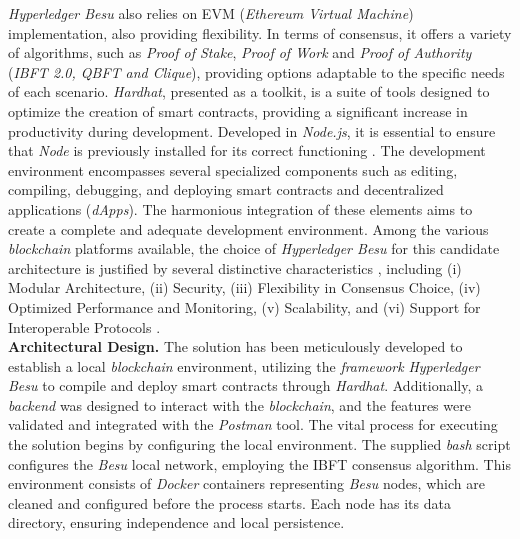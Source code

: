 \textit{Hyperledger Besu} also relies on EVM (\textit{Ethereum Virtual Machine}) implementation, also providing flexibility. %
In terms of consensus, it offers a variety of algorithms, such as \textit{Proof of Stake}, \textit{Proof of Work} and \textit{Proof of Authority} (\textit{IBFT 2.0, QBFT and Clique}), providing options adaptable to the specific needs of each scenario. \textit{Hardhat}, presented as a toolkit, is a suite of tools designed to optimize the creation of smart contracts, providing a significant increase in productivity during development. Developed in \textit{Node.js}, it is essential to ensure that \textit{Node} is previously installed for its correct functioning \cite{Jain2023}.
The development environment encompasses several specialized components such as editing, compiling, debugging, and deploying smart contracts and decentralized applications (\textit{dApps}). The harmonious integration of these elements aims to create a complete and adequate development environment.
Among the various \textit{blockchain} platforms available, the choice of \textit{Hyperledger Besu} for this candidate architecture is justified by several distinctive characteristics \cite{hasan2020blockchain}, including (i) Modular Architecture, (ii) Security, (iii) Flexibility in Consensus Choice, (iv) Optimized Performance and Monitoring, (v) Scalability, and (vi) Support for Interoperable Protocols \cite{Alba2023, Fan2022}.
\\
\noindent\textbf{Architectural Design.} The solution has been meticulously developed to establish a local \textit{blockchain} environment, utilizing the \textit{framework} \textit{Hyperledger Besu} to compile and deploy smart contracts through \textit{Hardhat}. Additionally, a \textit{backend} was designed to interact with the \textit{blockchain}, and the features were validated and integrated with the \textit{Postman} tool. The vital process for executing the solution begins by configuring the local environment. The supplied \textit{bash} script configures the \textit{Besu} local network, employing the IBFT consensus algorithm. This environment consists of \textit{Docker} containers representing \textit{Besu} nodes, which are cleaned and configured before the process starts. Each node has its data directory, ensuring independence and local persistence.

